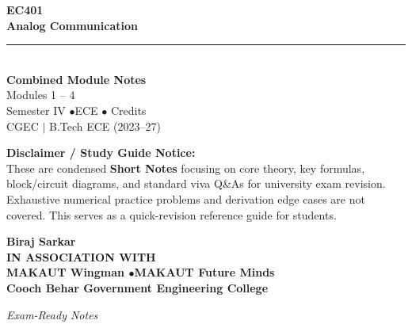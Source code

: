 \documentclass[12pt,a4paper]{article}
\begin{document}
\thispagestyle{empty}


\vspace*{1.0cm}
\begin{center}
  {\Huge\bfseries\color{myred} EC401}\\[10pt]
  {\LARGE\bfseries\color{mydark} Analog Communication}\\[20pt]
  {\color{myred}\rule{0.7\linewidth}{1.5pt}}\\[18pt]
  {\Large\color{myteal}\textbf{Combined Module Notes}}\\[8pt]
  {\large\color{mydark} Modules 1 -- 4}\\[40pt]
  {\normalsize\color{mydark} Semester IV \quad$\bullet$\quad ECE \quad$\bullet$ Credits}\\[12pt]
  {\normalsize\color{mydark} CGEC \;$|$\; B.Tech ECE (2023--27)}
\end{center}
\vspace{1.0cm}
\begin{center}
  \begin{tcolorbox}[colback=mygray, colframe=mgframe, boxrule=0.5pt, arc=3pt, width=0.85\linewidth]
    \centering\small\color{mydark}
    \textbf{Disclaimer / Study Guide Notice:}\\
    These are condensed \textbf{Short Notes} focusing on core theory, key formulas, block/circuit diagrams, and standard viva Q\&As for university exam revision. Exhaustive numerical practice problems and derivation edge cases are not covered. This serves as a quick-revision reference guide for students.
  \end{tcolorbox}
\end{center}
\vfill
\vspace{0.6cm}
\begin{center}
  {\large\bfseries\color{mypurple} Biraj Sarkar}\\[16pt]
  {\footnotesize\color{watermark}\textbf{IN ASSOCIATION WITH}}\\[8pt]
  {\small\bfseries\color{mydark} MAKAUT Wingman \quad$\bullet$\quad MAKAUT Future Minds}\\[12pt]
  {\large\bfseries\color{myteal} Cooch Behar Government Engineering College}
\end{center}
\vfill
\begin{center}{\small\color{watermark}\textit{Exam-Ready Notes}}\end{center}
\clearpage
\end{document}
